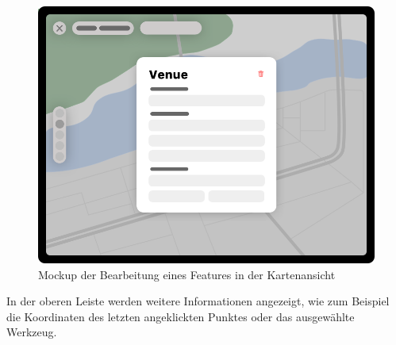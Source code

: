 \begin{figure}[h!]
	\centering
	\vspace{15pt}
	\includegraphics[scale=0.4]{images/design-map-edit}
	\caption{Mockup der Bearbeitung eines Features in der Kartenansicht}
	\label{fig:design-map-edit}
\end{figure}
In der oberen Leiste werden weitere Informationen angezeigt, wie zum Beispiel die Koordinaten des letzten angeklickten Punktes oder das ausgewählte Werkzeug.

